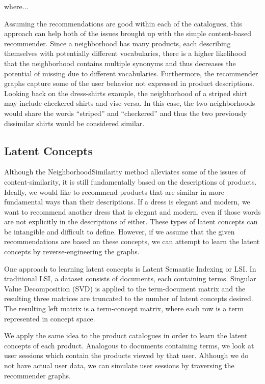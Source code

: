 \documentclass[11pt]{article}
\begin{document}
where...

Assuming the recommendations are good within each of the catalogues, this
approach can help both of the issues brought up with the simple content-based
recommender. Since a neighborhood has many products, each describing themselves
with potentially different vocabularies, there is a higher likelihood that the
neighborhood contains multiple synonyms and thus decreases the potential of
missing due to different vocabularies. Furthermore, the recommender graphs
capture some of the user behavior not expressed in product descriptions. Looking
back on the dress-shirts example, the neighborhood of a striped shirt may
include checkered shirts and vise-versa. In this case, the two neighborhoods
would share the words ``striped'' and ``checkered'' and thus the two previously
dissimilar shirts would be considered similar.

\subsection*{Latent Concepts}
Although the NeighborhoodSimilarity method alleviates some of the issues of
content-similarity, it is still fundamentally based on the descriptions of
products. Ideally, we would like to recommend products that are similar in more
fundamental ways than their descriptions. If a dress is elegant and modern, we
want to recommend another dress that is elegant and modern, even if those words
are not explicitly in the descriptions of either. These types of latent concepts
can be intangible and difficult to define. However, if we assume that the given
recommendations are based on these concepts, we can attempt to learn the latent
concepts by reverse-engineering the graphs.

One approach to learning latent concepts is Latent Semantic Indexing or LSI. In
traditional LSI, a dataset consists of documents, each containing terms.
Singular Value Decomposition (SVD) is applied to the term-document matrix and
the resulting three matrices are truncated to the number of latent concepts
desired. The resulting left matrix is a term-concept matrix, where each row is a
term represented in concept space.

We apply the same idea to the product catalogues in order to learn the latent
concepts of each product. Analogous to documents containing terms, we look at
user sessions which contain the products viewed by that user. Although we do not
have actual user data, we can simulate user sessions by traversing the
recommender graphs. 
\end{document}
